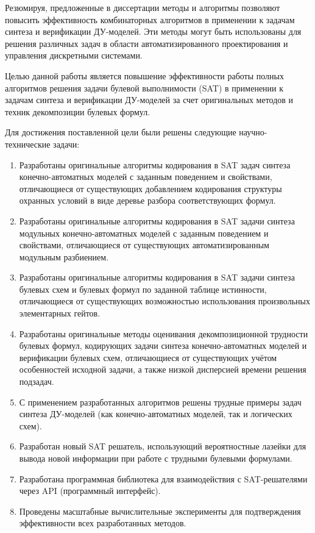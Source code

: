 Резюмируя, предложенные в диссертации методы и алгоритмы позволяют повысить эффективность комбинаторных алгоритмов в применении к задачам синтеза и верификации ДУ-моделей.
Эти методы могут быть использованы для решения различных задач в области автоматизированного проектирования и управления дискретными системами.


{\aim}
Целью данной работы является повышение эффективности работы полных алгоритмов решения задачи булевой выполнимости (SAT) в применении к задачам синтеза и верификации ДУ-моделей за счет оригинальных методов и техник декомпозиции булевых формул.


{\tasks}
Для достижения поставленной цели были решены следующие научно-технические задачи:
\begin{enumerate}[beginpenalty=10000]
    \item Разработаны оригинальные алгоритмы кодирования в SAT задач синтеза конечно-автоматных моделей с заданным поведением и свойствами, отличающиеся от существующих добавлением кодирования структуры охранных условий в виде деревье разбора соответствующих формул.
    \item Разработаны оригинальные алгоритмы кодирования в SAT задачи синтеза модульных конечно-автоматных моделей с заданным поведением и свойствами, отличающиеся от существующих автоматизированным модульным разбиением.
    \item Разработаны оригинальные алгоритмы кодирования в SAT задачи синтеза булевых схем и булевых формул по заданной таблице истинности, отличающиеся от существующих возможностью использования произвольных элементарных гейтов.
    \item Разработаны оригинальные методы оценивания декомпозиционной трудности булевых формул, кодирующих задачи синтеза конечно-автоматных моделей и верификации булевых схем, отличающиеся от существующих учётом особенностей исходной задачи, а также низкой дисперсией времени решения подзадач.
    \item С применением разработанных алгоритмов решены трудные примеры задач синтеза ДУ-моделей (как конечно-автоматных моделей, так и логических схем).
    \item Разработан новый SAT решатель, использующий вероятностные лазейки для вывода новой информации при работе с трудными булевыми формулами.
    \item Разработана программная библиотека для взаимодействия с SAT-решателями через API (программный интерфейс).
    \item Проведены масштабные вычислительные эксперименты для подтверждения эффективности всех разработанных методов.
\end{enumerate}


